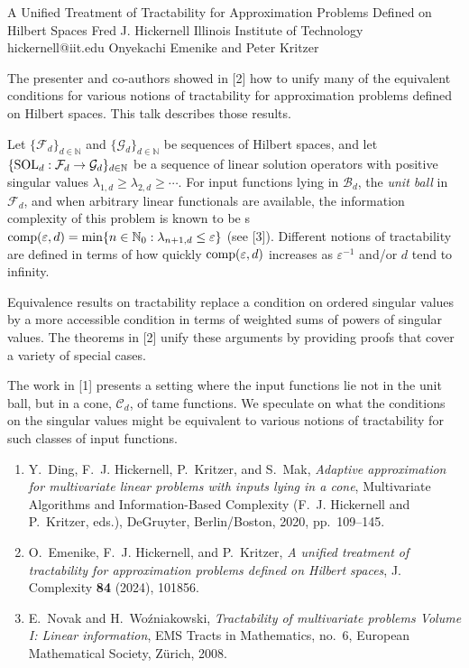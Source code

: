 \begin{talk}
  {A Unified Treatment of Tractability for Approximation Problems Defined on Hilbert Spaces}%
  {Fred J. Hickernell}%
  {Illinois Institute of Technology}%
  {hickernell@iit.edu}%
  {Onyekachi Emenike and Peter Kritzer}%
  
    
   
The presenter and co-authors showed in [2] how to unify many of the equivalent conditions for various notions of tractability for approximation problems defined on Hilbert spaces.  This talk describes those results.

Let $\{\mathcal{F}_d\}_{d \in \mathbb{N}}$ and $\{\mathcal{G}_d\}_{d \in \mathbb{N}}$ be sequences of Hilbert spaces, and let $\{\textup{SOL}_d : \mathcal{F}_d \to \mathcal{G}_d\}_{d \in \mathbb{N}}$ be a sequence of linear solution operators  with positive singular values $\lambda_{1,d} \ge \lambda_{2,d} \ge \cdots$.  For input functions lying in $\mathcal{B}_d$, the \emph{unit ball} in $\mathcal{F}_d$, and when arbitrary linear functionals are available, the information complexity of this problem is known to be s$\textup{comp}(\varepsilon, d) = \min \{n \in \mathbb{N}_0 : \lambda_{n+1, d} \le \varepsilon\}$ (see [3]).  Different notions of tractability are defined in terms of how quickly $\textup{comp}(\varepsilon, d)$  increases as $\varepsilon^{-1}$ and/or $d$ tend to infinity.

Equivalence results on tractability replace a condition on ordered singular values by a more accessible condition in terms of weighted sums of powers of singular values.  The theorems in [2] unify these arguments by providing proofs that cover a variety of special cases.

The work in [1] presents a setting where the input functions lie not in the unit ball, but in a cone, $\mathcal{C}_d$, of tame functions.  We speculate on what the conditions on the  singular values might be equivalent to various notions of tractability for such classes of input functions.

\begin{enumerate}
\renewcommand{\labelenumi}{[\arabic{enumi}]}
    \item
Y.~Ding, F.~J. Hickernell, P.~Kritzer, and S.~Mak, \emph{Adaptive approximation for multivariate linear problems with inputs lying in a cone}, Multivariate Algorithms and Information-Based Complexity (F.~J. Hickernell and P.~Kritzer, eds.), DeGruyter, Berlin/Boston, 2020, pp.~109--145.

 \item
O.~Emenike, F.~J. Hickernell, and P.~Kritzer, \emph{A unified treatment of tractability for approximation problems defined on {H}ilbert spaces}, J. Complexity \textbf{84} (2024), 101856.

\item 
E.~Novak and H.~Wo{\'{z}}niakowski, \emph{Tractability of multivariate problems {V}olume {I}: {L}inear information}, EMS Tracts in Mathematics, no.~6, European Mathematical Society, Z\"urich, 2008.

\end{enumerate}


\end{talk}
